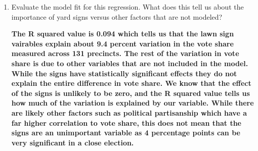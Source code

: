 \documentclass[12pt,letterpaper]{article}
\begin{document}
\begin{enumerate}
	
	\item [(d)] Evaluate the model fit for this regression.  What does this	tell us about the importance of yard signs versus other factors that are not modeled?
	
	\textbf{The R squared value is 0.094 which tells us that the lawn sign vairables explain about 9.4 percent variation in the vote share measured across 131 precincts. The rest of the variation in vote share is due to other variables that are not included in the model. While the signs have statistically significant effects they do not explain the entire difference in vote share. We know that the effect of the signs is unlikely to be zero, and the R squared value tells us how much of the variation is explained by our variable. While there are likely other factors such as political partisanship which have a far higher correlation to vote share, this does not mean that the signs are an unimportant variable as 4 percentage points can be very significant in a close election.}
	
\end{enumerate}  
\end{document}
